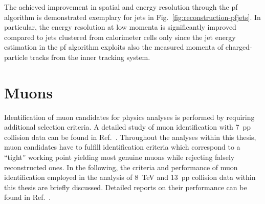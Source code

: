 The achieved improvement in spatial and energy resolution through the \gls{pf} algorithm is demonstrated exemplary for jets in Fig.~\ref{fig:reconstruction-pfjets}. In particular, the energy resolution at low momenta is significantly improved compared to jets clustered from calorimeter cells only since the jet energy estimation in the \gls{pf} algorithm exploits also the measured momenta of charged-particle tracks from the inner tracking system.


\section{Muons}
\label{sec:reconstruction-muons}

Identification of muon candidates for physics analyses is performed by requiring additional selection criteria. A detailed study of muon identification with 7~\TeV \gls{pp} collision data can be found in Ref.~\cite{Chatrchyan:2012xi}. Throughout the analyses within this thesis, muon candidates have to fulfill identification criteria which correspond to a ``tight'' working point yielding most genuine muons while rejecting falsely reconstructed ones. In the following, the criteria and performance of muon identification employed in the analysis of 8~TeV and 13~\TeV \gls{pp} collision data within this thesis are briefly discussed. Detailed reports on their performance can be found in Ref.~\cite{CMS-DP-2013-009,CMS-DP-2017-007}.

